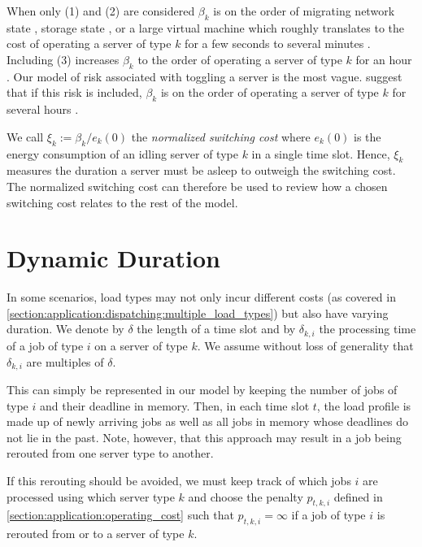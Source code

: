 When only (1) and (2) are considered $\beta_k$ is on the order of migrating network state \cite{Chen2008}, storage state \cite{Thereska2009}, or a large virtual machine \cite{Clark2005} which roughly translates to the cost of operating a server of type $k$ for a few seconds to several minutes \cite{Lin2011}. Including (3) increases $\beta_k$ to the order of operating a server of type $k$ for an hour \cite{Bodik2008}. Our model of risk associated with toggling a server is the most vague. \citeauthor*{Lin2011} suggest that if this risk is included, $\beta_k$ is on the order of operating a server of type $k$ for several hours \cite{Lin2011}.

We call $\xi_k := \beta_k / e_k(0)$ the \textit{normalized switching cost} where $e_k(0)$ is the energy consumption of an idling server of type $k$ in a single time slot. Hence, $\xi_k$ measures the duration a server must be asleep to outweigh the switching cost. The normalized switching cost can therefore be used to review how a chosen switching cost relates to the rest of the model.

\section{Dynamic Duration}\label{section:application:dynamic_duration}

In some scenarios, load types may not only incur different costs (as covered in \autoref{section:application:dispatching:multiple_load_types}) but also have varying duration. We denote by $\delta$ the length of a time slot and by $\delta_{k,i}$ the processing time of a job of type $i$ on a server of type $k$. We assume without loss of generality that $\delta_{k,i}$ are multiples of $\delta$.

This can simply be represented in our model by keeping the number of jobs of type $i$ and their deadline in memory. Then, in each time slot $t$, the load profile is made up of newly arriving jobs as well as all jobs in memory whose deadlines do not lie in the past. Note, however, that this approach may result in a job being rerouted from one server type to another.

If this rerouting should be avoided, we must keep track of which jobs $i$ are processed using which server type $k$ and choose the penalty $p_{t,k,i}$ defined in \autoref{section:application:operating_cost} such that $p_{t,k,i} = \infty$ if a job of type $i$ is rerouted from or to a server of type $k$.

